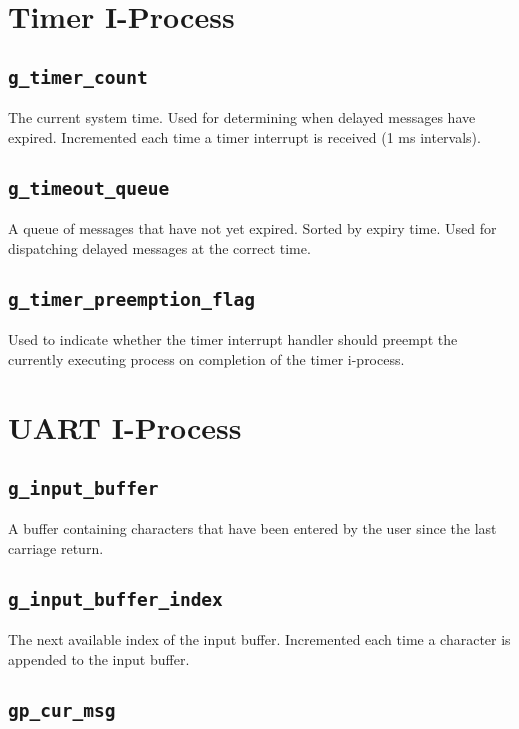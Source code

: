 \documentclass[12pt]{report}
\begin{document}

\section{Timer I-Process}

\subsection{\texttt{g_timer_count}}

The current system time. Used for determining when delayed messages have expired. Incremented each time a timer interrupt is received (1 ms intervals).

\subsection{\texttt{g_timeout_queue}}

A queue of messages that have not yet expired. Sorted by expiry time. Used for dispatching delayed messages at the correct time.

\subsection{\texttt{g_timer_preemption_flag}}

Used to indicate whether the timer interrupt handler should preempt the currently executing process on completion of the timer i-process.

\section{UART I-Process}

\subsection{\texttt{g_input_buffer}}

A buffer containing characters that have been entered by the user since the last carriage return.

\subsection{\texttt{g_input_buffer_index}}

The next available index of the input buffer. Incremented each time a character is appended to the input buffer. 

\subsection{\texttt{gp_cur_msg}}
\end{document}
